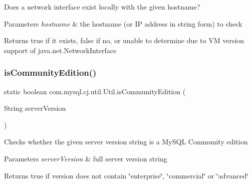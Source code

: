 Does a network interface exist locally with the given hostname?


\begin{DoxyParams}{Parameters}
{\em hostname} & the hostname (or IP address in string form) to check \\
\hline
\end{DoxyParams}
\begin{DoxyReturn}{Returns}
true if it exists, false if no, or unable to determine due to VM version support of java.\+net.\+Network\+Interface 
\end{DoxyReturn}
\mbox{\label{classcom_1_1mysql_1_1cj_1_1util_1_1_util_ae6f8c91f805d5d3960a40c0a2892092e}} 
\subsubsection{\texorpdfstring{is\+Community\+Edition()}{isCommunityEdition()}}
{\footnotesize\ttfamily static boolean com.\+mysql.\+cj.\+util.\+Util.\+is\+Community\+Edition (\begin{DoxyParamCaption}\item[{String}]{server\+Version }\end{DoxyParamCaption})\hspace{0.3cm}{\ttfamily [static]}}

Checks whether the given server version string is a My\+S\+QL Community edition


\begin{DoxyParams}{Parameters}
{\em server\+Version} & full server version string \\
\hline
\end{DoxyParams}
\begin{DoxyReturn}{Returns}
true if version does not contain \char`\"{}enterprise\char`\"{}, \char`\"{}commercial\char`\"{} or \char`\"{}advanced\char`\"{} 
\end{DoxyReturn}
\mbox{\label{classcom_1_1mysql_1_1cj_1_1util_1_1_util_a544537a70dee543f33219f1641be7c75}} 
